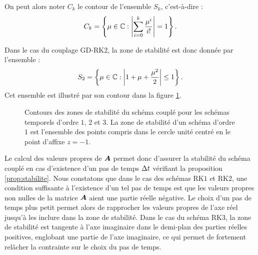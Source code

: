 On peut alors noter $C_k$ le contour de l'ensemble $S_k$, c'est-à-dire :
\begin{align}
	C_k = \left \{
		\mu \in \mathbb{C} : \left\vert\sum_{i=0}^{k} \frac{\mu^i}{i!}\right\vert = 1
	\right \} .
\end{align}

Dans le cas du couplage GD-RK$2$, la zone de stabilité est donc donnée par l'ensemble :
\begin{align}
	S_2 = \left \{
		\mu \in \mathbb{C} : \left\vert1 + \mu + \frac{\mu^2}{2}\right\vert \le 1
	\right \} .
\end{align}
Cet ensemble est illustré par son contour dans la figure \ref{img:zone_stabilite_rk2}.


\begin{figure}[!h]
	\begin{center}
		\caption{
			\label{img:zone_stabilite_rk2}
			Contours des zones de stabilité du schéma couplé pour les schémas temporels d'ordre $1$, $2$ et $3$.
			La zone de stabilité d'un schéma d'ordre $1$ est l'ensemble des points compris dans
			le cercle unité centré en le point d'affixe $z = -1$.
		}
		
	\end{center}
\end{figure}


Le calcul des valeurs propres de $\bm{A}$ permet donc d'assurer la stabilité
du schéma couplé en cas d'existence d'un pas de temps $\Delta t$ vérifiant la proposition
\ref{prop:stabilite}.
Nous constatons que dans le cas des schémas RK$1$ et RK$2$, une condition suffisante à l'existence
d'un tel pas de temps est que les valeurs propres non nulles de la matrice $\bm{A}$
aient une partie réelle négative.
Le choix d'un pas de temps plus petit permet alors de
rapprocher les valeurs propres de l'axe réel jusqu'à les inclure dans la zone de stabilité.
Dans le cas du schéma RK$3$, la zone de stabilité est tangente à l'axe imaginaire
dans le demi-plan des parties réelles positives, englobant une partie de l'axe
imaginaire, ce qui permet de fortement relâcher la contrainte sur le choix du pas de temps.

